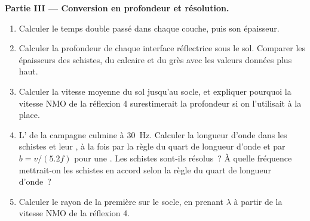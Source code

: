 \begin{problem}
\noindent\textbf{Partie III --- Conversion en profondeur et résolution.}
\begin{enumerate}[resume]
  \item Calculer le temps double passé dans chaque couche, puis son épaisseur.
  \item Calculer la profondeur de chaque interface réflectrice sous le sol. Comparer
        les épaisseurs des schistes, du calcaire et du grès avec les valeurs
        données plus haut.
  \item Calculer la vitesse moyenne du sol jusqu'au socle, et expliquer pourquoi
        la vitesse NMO de la réflexion 4 surestimerait la profondeur si on l'utilisait
        à la place.
  \item L' de la campagne culmine à \qty{30}{Hz}. Calculer la longueur d'onde dans
        les schistes et leur , à la fois par la règle du quart de longueur d'onde
        et par $b = v/(5.2f)$ pour une . Les schistes sont-ils résolus~? À
        quelle fréquence mettrait-on les schistes en accord selon la règle du quart de longueur d'onde~?
  \item Calculer le rayon de la première  sur le socle, en prenant
        $\lambda$ à partir de la vitesse NMO de la réflexion 4.
\end{enumerate}


\end{problem}
